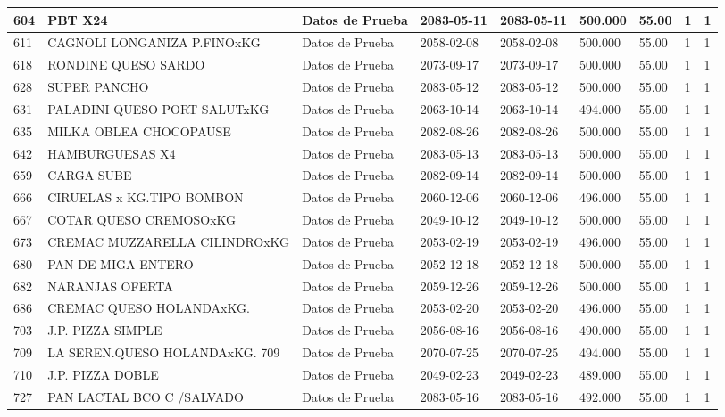 \documentclass[a4paper,12pt]{article}
\begin{document}
\begin{landscape}
\begin{longtable}{|p{4cm}|p{2.5cm}|p{2.5cm}|p{1.8cm}|p{1.8cm}|p{1cm}|p{1cm}|p{3cm}|p{3cm}||}
604 & PBT X24 & Datos de Prueba & 2083-05-11 & 2083-05-11 & 500.000 & 55.00 & 1 & 1 \\ \hline 
611 & CAGNOLI LONGANIZA P.FINOxKG & Datos de Prueba & 2058-02-08 & 2058-02-08 & 500.000 & 55.00 & 1 & 1 \\ \hline 
618 & RONDINE QUESO SARDO & Datos de Prueba & 2073-09-17 & 2073-09-17 & 500.000 & 55.00 & 1 & 1 \\ \hline 
628 & SUPER PANCHO & Datos de Prueba & 2083-05-12 & 2083-05-12 & 500.000 & 55.00 & 1 & 1 \\ \hline 
631 & PALADINI QUESO PORT SALUTxKG & Datos de Prueba & 2063-10-14 & 2063-10-14 & 494.000 & 55.00 & 1 & 1 \\ \hline 
635 & MILKA OBLEA CHOCOPAUSE & Datos de Prueba & 2082-08-26 & 2082-08-26 & 500.000 & 55.00 & 1 & 1 \\ \hline 
642 & HAMBURGUESAS X4 & Datos de Prueba & 2083-05-13 & 2083-05-13 & 500.000 & 55.00 & 1 & 1 \\ \hline 
659 & CARGA SUBE & Datos de Prueba & 2082-09-14 & 2082-09-14 & 500.000 & 55.00 & 1 & 1 \\ \hline 
666 & CIRUELAS x KG.TIPO BOMBON & Datos de Prueba & 2060-12-06 & 2060-12-06 & 496.000 & 55.00 & 1 & 1 \\ \hline 
667 & COTAR QUESO CREMOSOxKG & Datos de Prueba & 2049-10-12 & 2049-10-12 & 500.000 & 55.00 & 1 & 1 \\ \hline 
673 & CREMAC MUZZARELLA CILINDROxKG & Datos de Prueba & 2053-02-19 & 2053-02-19 & 496.000 & 55.00 & 1 & 1 \\ \hline 
680 &  PAN DE MIGA ENTERO & Datos de Prueba & 2052-12-18 & 2052-12-18 & 500.000 & 55.00 & 1 & 1 \\ \hline 
682 & NARANJAS OFERTA & Datos de Prueba & 2059-12-26 & 2059-12-26 & 500.000 & 55.00 & 1 & 1 \\ \hline 
686 & CREMAC QUESO HOLANDAxKG. & Datos de Prueba & 2053-02-20 & 2053-02-20 & 496.000 & 55.00 & 1 & 1 \\ \hline 
703 & J.P. PIZZA SIMPLE & Datos de Prueba & 2056-08-16 & 2056-08-16 & 490.000 & 55.00 & 1 & 1 \\ \hline 
709 & LA SEREN.QUESO HOLANDAxKG. 709 & Datos de Prueba & 2070-07-25 & 2070-07-25 & 494.000 & 55.00 & 1 & 1 \\ \hline 
710 & J.P. PIZZA DOBLE & Datos de Prueba & 2049-02-23 & 2049-02-23 & 489.000 & 55.00 & 1 & 1 \\ \hline 
727 & PAN LACTAL BCO C /SALVADO & Datos de Prueba & 2083-05-16 & 2083-05-16 & 492.000 & 55.00 & 1 & 1 \\ \hline 

\end{longtable}
\end{landscape}
\end{document}
